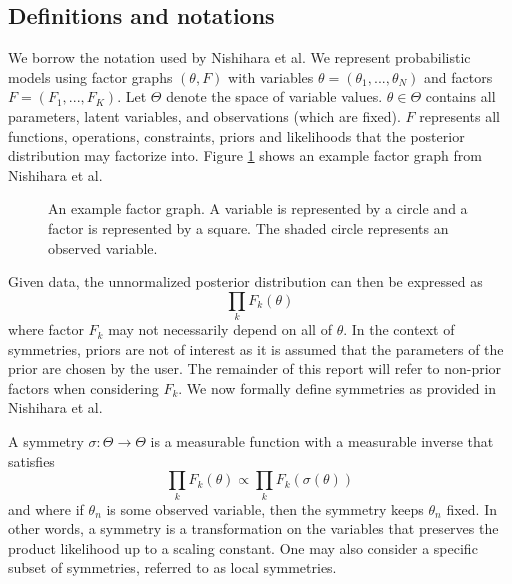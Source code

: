 \subsection{Definitions and notations}

We borrow the notation used by Nishihara et al. We represent probabilistic models using factor graphs $(\theta,F)$ with variables $\theta=(\theta_1,...,\theta_N)$ and factors $F=(F_1,...,F_K)$. Let $\Theta$ denote the space of variable values. $\theta\in\Theta$ contains all parameters, latent variables, and observations (which are fixed). $F$ represents all functions, operations, constraints, priors and likelihoods that the posterior distribution may factorize into. Figure \ref{fig:factorgraph} shows an example factor graph from Nishihara et al.

\begin{figure}[h]
\begin{center}
\end{center}
\caption{An example factor graph. A variable is represented by a circle and a factor is represented by a square. The shaded circle represents an observed variable.}
\label{fig:factorgraph}
\end{figure}

Given data, the unnormalized posterior distribution can then be expressed as
\[
\prod_kF_k(\theta)
\]
where factor $F_k$ may not necessarily depend on all of $\theta$. In the context of symmetries, priors are not of interest as it is assumed that the parameters of the prior are chosen by the user. The remainder of this report will refer to non-prior factors when considering $F_k$. We now formally define symmetries as provided in Nishihara et al.
\begin{defn}
A symmetry $\sigma:\Theta\rightarrow\Theta$ is a measurable function with a measurable inverse that satisfies
\[
\prod_kF_k(\theta) \propto \prod_kF_k(\sigma(\theta))
\]
and where if $\theta_n$ is some observed variable, then the symmetry keeps $\theta_n$ fixed. In other words, a symmetry is a transformation on the variables that preserves the product likelihood up to a scaling constant. One may also consider a specific subset of symmetries, referred to as local symmetries.
\end{defn}

